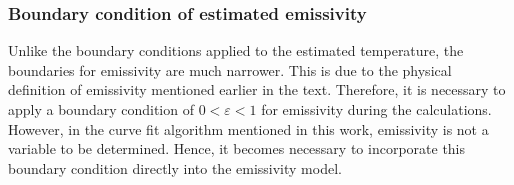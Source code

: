 \subsubsection{Boundary condition of estimated emissivity}
Unlike the boundary conditions applied to the estimated temperature, 
the boundaries for emissivity are much narrower. This is due to the 
physical definition of emissivity mentioned earlier in the text. 
Therefore, it is necessary to apply a boundary condition 
of $0 < \varepsilon < 1$ for emissivity during the calculations. 
However, in the curve fit algorithm mentioned in this work, emissivity 
is not a variable to be determined. Hence, it becomes necessary to 
incorporate this boundary condition directly into the emissivity model.